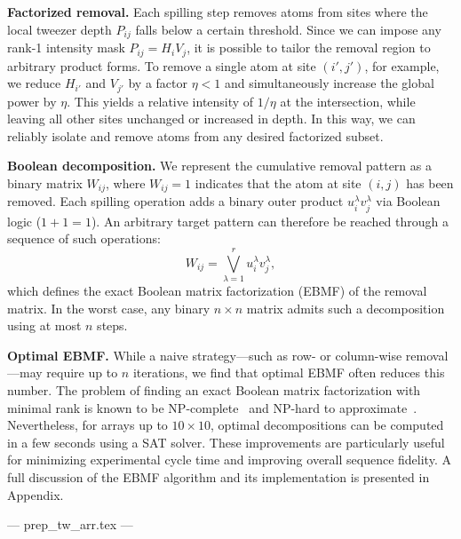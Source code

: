 \textbf{Factorized removal.}
Each spilling step removes atoms from sites where the local tweezer depth $P_{ij}$ falls below a certain threshold. Since we can impose any rank-1 intensity mask $P_{ij} = H_i V_j$, it is possible to tailor the removal region to arbitrary product forms. To remove a single atom at site $(i', j')$, for example, we reduce $H_{i'}$ and $V_{j'}$ by a factor $\eta < 1$ and simultaneously increase the global power by $\eta$. This yields a relative intensity of $1/\eta$ at the intersection, while leaving all other sites unchanged or increased in depth. In this way, we can reliably isolate and remove atoms from any desired factorized subset.

\textbf{Boolean decomposition.}
We represent the cumulative removal pattern as a binary matrix $W_{ij}$, where $W_{ij} = 1$ indicates that the atom at site $(i, j)$ has been removed. Each spilling operation adds a binary outer product $u^\lambda_i v^\lambda_j$ via Boolean logic ($1 + 1 = 1$). An arbitrary target pattern can therefore be reached through a sequence of such operations:
\begin{equation}
    \label{eq:ebmf}
    W_{ij} = \bigvee_{\lambda=1}^{r} u^\lambda_i v^\lambda_j,
\end{equation}
which defines the exact Boolean matrix factorization (EBMF) of the removal matrix. In the worst case, any binary $n \times n$ matrix admits such a decomposition using at most $n$ steps.

\textbf{Optimal EBMF.}
While a naive strategy—such as row- or column-wise removal—may require up to $n$ iterations, we find that optimal EBMF often reduces this number. The problem of finding an exact Boolean matrix factorization with minimal rank is known to be NP-complete~\cite{orlin_contentment_1977} and NP-hard to approximate~\cite{gruber_inapproximability_2007}. Nevertheless, for arrays up to $10 \times 10$, optimal decompositions can be computed in a few seconds using a SAT solver. These improvements are particularly useful for minimizing experimental cycle time and improving overall sequence fidelity. A full discussion of the EBMF algorithm and its implementation is presented in Appendix.



--- prep_tw_arr.tex ---


